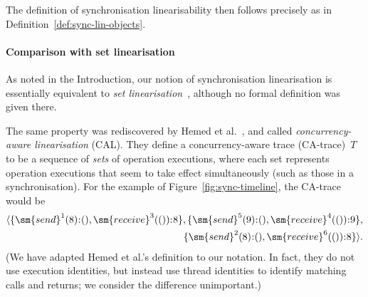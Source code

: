 The definition of synchronisation linearisability then follows precisely as in
Definition~\ref{def:sync-lin-objects}.


\paragraph{Comparison with set linearisation} 

\label{sec:set-lin-comparison}
As noted in the Introduction, our notion of synchronisation linearisation is
essentially equivalent to \emph{set linearisation}~\cite{Neiger-1994},
although no formal definition was given there.

The same property was rediscovered by Hemed et al.~\cite{HRV-2015}, and called
\emph{concurrency-aware linearisation} (CAL).  They define a concurrency-aware
trace (CA-trace)~$T$ to be a sequence of \emph{sets} of operation executions,
where each set represents operation executions that seem to take effect
simultaneously (such as those in a synchronisation).  For the example of
Figure~\ref{fig:sync-timeline}, the CA-trace would be
\[
\begin{align}
\seq{ \set{\sm{send}^1(8)\::(), \sm{receive}^3(())\::8},
  \set{ \sm{send}^5(9)\::(), \sm{receive}^4(())\::9 }, \\
\qquad
  \set{ \sm{send}^2(8)\::(), \sm{receive}^6(())\::8 } }.
\end{align}
\]
(We have adapted Hemed et al.'s definition to our notation.  In fact, they do
not use execution identities, but instead use thread identities to identify
matching calls and returns; we consider the difference unimportant.)


